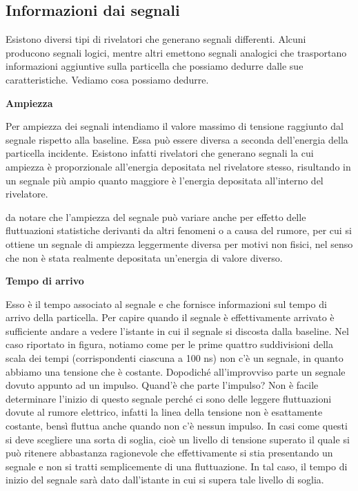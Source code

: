 \subsection{Informazioni dai segnali}

Esistono diversi tipi di rivelatori che generano segnali differenti. Alcuni producono segnali logici, mentre altri emettono segnali analogici che trasportano informazioni aggiuntive sulla particella che possiamo dedurre dalle sue caratteristiche. Vediamo cosa possiamo dedurre.

\vspace{0.2cm}\textbf{Ampiezza}

Per ampiezza dei segnali intendiamo il valore massimo di tensione raggiunto dal segnale rispetto alla baseline. Essa può essere diversa a seconda dell'energia della particella incidente. Esistono infatti rivelatori che generano segnali la cui ampiezza è proporzionale all'energia depositata nel rivelatore stesso, risultando in un segnale più ampio quanto maggiore è l'energia depositata all'interno del rivelatore.

\E da notare che l'ampiezza del segnale può variare anche per effetto delle fluttuazioni statistiche derivanti da altri fenomeni o a causa del rumore, per cui si ottiene un segnale di ampiezza leggermente diversa per motivi non fisici, nel senso che non è stata realmente depositata un'energia di valore diverso.

\vspace{0.2cm}\textbf{Tempo di arrivo}

Esso è il tempo associato al segnale e che fornisce informazioni sul tempo di arrivo della particella. Per capire quando il segnale è effettivamente arrivato è sufficiente andare a vedere l'istante in cui il segnale si discosta dalla baseline. Nel caso riportato in figura, notiamo come per le prime quattro suddivisioni della scala dei tempi (corrispondenti ciascuna a 100 ns) non c'è un segnale, in quanto abbiamo una tensione che è costante. Dopodiché all'improvviso parte un segnale dovuto appunto ad un impulso. Quand'è che parte l'impulso? Non è facile determinare l'inizio di questo segnale perché ci sono delle leggere fluttuazioni dovute al rumore elettrico, infatti la linea della tensione non è esattamente costante, bensì fluttua anche quando non c'è nessun impulso. In casi come questi si deve scegliere una sorta di soglia, cioè un livello di tensione superato il quale si può ritenere abbastanza ragionevole che effettivamente si stia presentando un segnale e non si tratti semplicemente di una fluttuazione. In tal caso, il tempo di inizio del segnale sarà dato dall'istante in cui si supera tale livello di soglia.

